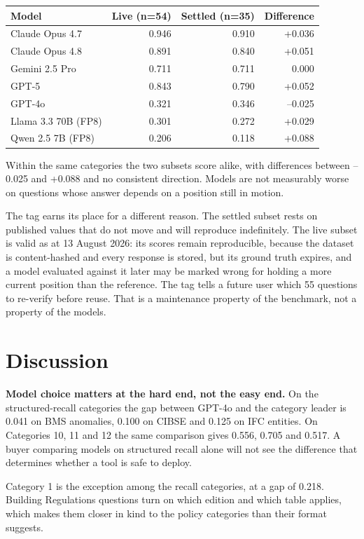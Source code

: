 \documentclass[11pt,a4paper]{article}
\begin{document}
\begin{center}
\begin{tabular}{lrrr}
\toprule
Model & Live (n=54) & Settled (n=35) & Difference \\
\midrule
Claude Opus 4.7 & 0.946 & 0.910 & +0.036 \\
Claude Opus 4.8 & 0.891 & 0.840 & +0.051 \\
Gemini 2.5 Pro & 0.711 & 0.711 & 0.000 \\
GPT-5 & 0.843 & 0.790 & +0.052 \\
GPT-4o & 0.321 & 0.346 & --0.025 \\
Llama 3.3 70B (FP8) & 0.301 & 0.272 & +0.029 \\
Qwen 2.5 7B (FP8) & 0.206 & 0.118 & +0.088 \\
\bottomrule
\end{tabular}
\end{center}

Within the same categories the two subsets score alike, with differences between --0.025 and +0.088 and no consistent direction. Models are not measurably worse on questions whose answer depends on a position still in motion.

The tag earns its place for a different reason. The settled subset rests on published values that do not move and will reproduce indefinitely. The live subset is valid as at 13 August 2026: its scores remain reproducible, because the dataset is content-hashed and every response is stored, but its ground truth expires, and a model evaluated against it later may be marked wrong for holding a more current position than the reference. The tag tells a future user which 55 questions to re-verify before reuse. That is a maintenance property of the benchmark, not a property of the models.


\section{Discussion}

\textbf{Model choice matters at the hard end, not the easy end.} On the structured-recall categories the gap between GPT-4o and the category leader is 0.041 on BMS anomalies, 0.100 on CIBSE and 0.125 on IFC entities. On Categories 10, 11 and 12 the same comparison gives 0.556, 0.705 and 0.517. A buyer comparing models on structured recall alone will not see the difference that determines whether a tool is safe to deploy.

Category 1 is the exception among the recall categories, at a gap of 0.218. Building Regulations questions turn on which edition and which table applies, which makes them closer in kind to the policy categories than their format suggests.
\end{document}

